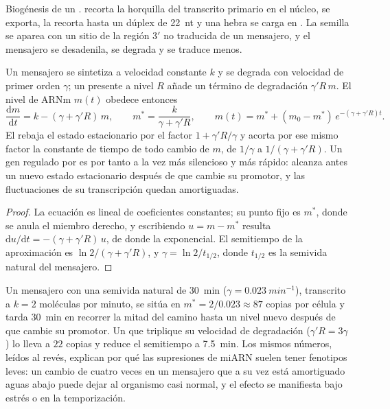 \begin{omfigure}
{\small Biogénesis de un .  recorta la horquilla del
transcrito primario en el núcleo, se exporta,  la recorta hasta un
dúplex de \qty{22}{nt} y una hebra se carga en . La semilla se
aparea con un sitio de la región 3$'$ no traducida de un mensajero, y el
mensajero se desadenila, se degrada y se traduce menos.}
\end{omfigure}

\begin{theorem}\label{thm:b3:rna-regulation:mirna-kinetics}
Un mensajero se sintetiza a velocidad constante $k$ y se degrada con
velocidad de primer orden $\gamma$; un  presente a nivel $R$
añade un término de degradación $\gamma' R\, m$. El nivel de ARNm $m(t)$
obedece entonces
\[
\frac{\mathrm{d}m}{\mathrm{d}t} = k - (\gamma + \gamma' R)\, m,
\qquad
m^{*} = \frac{k}{\gamma + \gamma' R},
\qquad
m(t) = m^{*} + (m_{0} - m^{*})\,e^{-(\gamma + \gamma' R)t}.
\]
El  rebaja el estado estacionario por el factor $1 + \gamma' R/
\gamma$ y acorta por ese mismo factor la constante de tiempo de todo
cambio de $m$, de $1/\gamma$ a $1/(\gamma + \gamma' R)$. Un gen regulado
por  es por tanto a la vez más silencioso y más rápido: alcanza
antes un nuevo estado estacionario después de que cambie su promotor, y
las fluctuaciones de su transcripción quedan amortiguadas.
\end{theorem}
\begin{proof}
La ecuación es lineal de coeficientes constantes; su punto fijo es
$m^{*}$, donde se anula el miembro derecho, y escribiendo $u = m - m^{*}$
resulta $\mathrm{d}u/\mathrm{d}t = -(\gamma + \gamma' R)\,u$, de donde la
exponencial. El semitiempo de la aproximación es $\ln 2/(\gamma + \gamma'
R)$, y $\gamma = \ln 2 / t_{1/2}$, donde $t_{1/2}$ es la semivida natural
del mensajero.
\end{proof}

\begin{example}\label{ex:b3:rna-regulation:fourfold}
Un mensajero con una semivida natural de \qty{30}{min} ($\gamma =
\qty{0.023}{min^{-1}}$), transcrito a $k = 2$ moléculas por minuto, se
sitúa en $m^{*} = 2/0.023 \approx 87$ copias por célula y tarda
\qty{30}{min} en recorrer la mitad del camino hasta un nivel nuevo
después de que cambie su promotor. Un  que triplique su velocidad
de degradación ($\gamma' R = 3\gamma$) lo lleva a $22$ copias y reduce el
semitiempo a \qty{7.5}{min}. Los mismos números, leídos al revés,
explican por qué las supresiones de miARN suelen tener fenotipos leves:
un cambio de cuatro veces en un mensajero que a su vez está amortiguado
aguas abajo puede dejar al organismo casi normal, y el efecto se
manifiesta bajo estrés o en la temporización.
\end{example}

